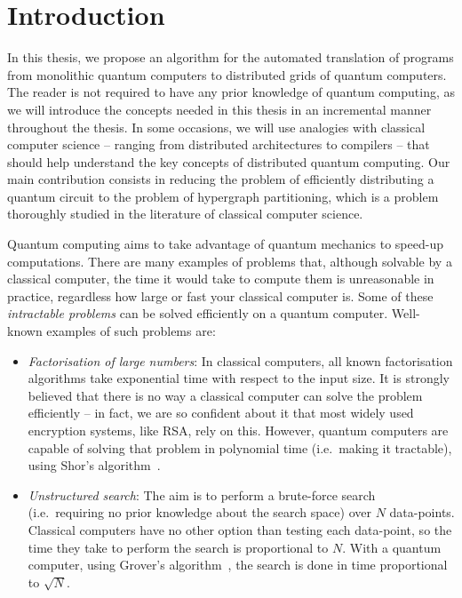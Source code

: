 \chapter{Introduction}
\label{chap:Introduction}

In this thesis, we propose an algorithm for the automated translation of programs from monolithic quantum computers to distributed grids of quantum computers. The reader is not required to have any prior knowledge of quantum computing, as we will introduce the concepts needed in this thesis in an incremental manner throughout the thesis. In some occasions, we will use analogies with classical computer science -- ranging from distributed architectures to compilers -- that should help understand the key concepts of distributed quantum computing. Our main contribution consists in reducing the problem of efficiently distributing a quantum circuit to the problem of hypergraph partitioning, which is a problem thoroughly studied in the literature of classical computer science.

Quantum computing aims to take advantage of quantum mechanics to speed-up computations. There are many examples of problems that, although solvable by a classical computer, the time it would take to compute them is unreasonable in practice, regardless how large or fast your classical computer is. Some of these \textit{intractable problems} can be solved efficiently on a quantum computer. Well-known examples of such problems are:

\begin{itemize} 
\item \textit{Factorisation of large numbers}: In classical computers, all known factorisation algorithms take exponential time with respect to the input size. It is strongly believed that there is no way a classical computer can solve the problem efficiently -- in fact, we are so confident about it that most widely used encryption systems, like RSA, rely on this. However, quantum computers are capable of solving that problem in polynomial time (i.e.\ making it tractable), using Shor's algorithm~\citep{Shor}.
\item \textit{Unstructured search}: The aim is to perform a brute-force search (i.e.\ requiring no prior knowledge about the search space) over \(N\) data-points. Classical computers have no other option than testing each data-point, so the time they take to perform the search is proportional to \(N\). With a quantum computer, using Grover's algorithm~\citep{Grover}, the search is done in time proportional to \(\sqrt{N}\).
\end{itemize}


